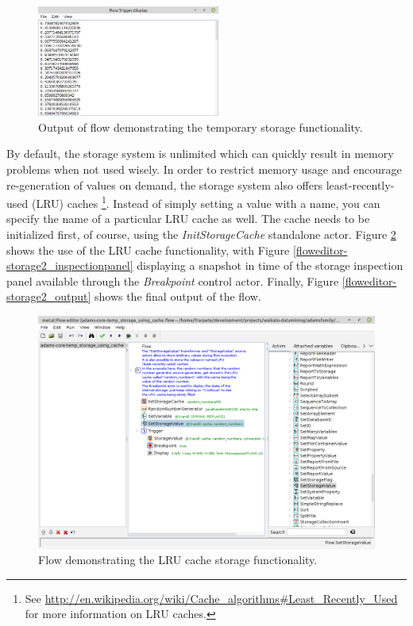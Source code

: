 \begin{figure}[htb]
  \centering
  \includegraphics[width=6.0cm]{images/floweditor-storage1_output.png}
  \caption{Output of flow demonstrating the temporary storage
  functionality.}
  \label{floweditor-storage1_output}
\end{figure}

By default, the storage system is unlimited which can quickly result in memory
problems when not used wisely. In order to restrict memory usage and encourage
re-generation of values on demand, the storage system also offers
least-recently-used (LRU) caches \footnote{See
\url{http://en.wikipedia.org/wiki/Cache_algorithms\#Least_Recently_Used}{} for
more information on LRU caches.}. Instead of simply setting a value with a name,
you can specify the name of a particular LRU cache as well. The cache needs to
be initialized first, of course, using the \textit{InitStorageCache} standalone
actor. Figure \ref{floweditor-storage2_flow} shows the use of the LRU cache
functionality, with Figure \ref{floweditor-storage2_inspectionpanel} displaying
a snapshot in time of the storage inspection panel available through the
\textit{Breakpoint} control actor. Finally, Figure
\ref{floweditor-storage2_output} shows the final output of the flow.

\begin{figure}[htb]
  \centering
  \includegraphics[width=12.0cm]{images/floweditor-storage2_flow.png}
  \caption{Flow demonstrating the LRU cache storage functionality.}
  \label{floweditor-storage2_flow}
\end{figure}

